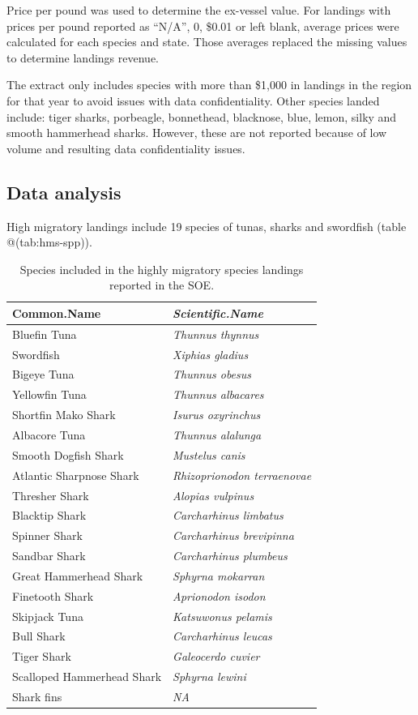 \documentclass[
]{book}
\begin{document}
Price per pound was used to determine the ex-vessel value. For landings with prices per pound reported as ``N/A'', 0, \$0.01 or left blank, average prices were calculated for each species and state. Those averages replaced the missing values to determine landings revenue.

The extract only includes species with more than \$1,000 in landings in the region for that year to avoid issues with data confidentiality. Other species landed include: tiger sharks, porbeagle, bonnethead, blacknose, blue, lemon, silky and smooth hammerhead sharks. However, these are not reported because of low volume and resulting data confidentiality issues.

\hypertarget{data-analysis-18}{%
\subsection{Data analysis}\label{data-analysis-18}}

High migratory landings include 19 species of tunas, sharks and swordfish (table @(tab:hms-spp)).

\begin{table}

\caption{\label{tab:hms-spp}Species included in the highly migratory species landings reported in the SOE.}
\centering
\begin{tabular}[t]{l|>{\em}l}
\hline
Common.Name & Scientific.Name\\
\hline
Bluefin Tuna & Thunnus thynnus\\
\hline
Swordfish & Xiphias gladius\\
\hline
Bigeye Tuna & Thunnus obesus\\
\hline
Yellowfin Tuna & Thunnus albacares\\
\hline
Shortfin Mako Shark & Isurus oxyrinchus\\
\hline
Albacore Tuna & Thunnus alalunga\\
\hline
Smooth Dogfish Shark & Mustelus canis\\
\hline
Atlantic Sharpnose Shark & Rhizoprionodon terraenovae\\
\hline
Thresher Shark & Alopias vulpinus\\
\hline
Blacktip Shark & Carcharhinus limbatus\\
\hline
Spinner Shark & Carcharhinus brevipinna\\
\hline
Sandbar Shark & Carcharhinus plumbeus\\
\hline
Great Hammerhead Shark & Sphyrna mokarran\\
\hline
Finetooth Shark & Aprionodon isodon\\
\hline
Skipjack Tuna & Katsuwonus pelamis\\
\hline
Bull Shark & Carcharhinus leucas\\
\hline
Tiger Shark & Galeocerdo cuvier\\
\hline
Scalloped Hammerhead Shark & Sphyrna lewini\\
\hline
Shark fins & NA\\
\hline
\end{tabular}
\end{table}
\end{document}
